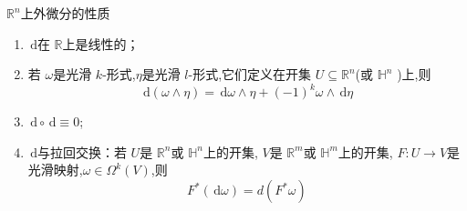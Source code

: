 \documentclass[../../几何与拓扑.tex]{subfiles}
\begin{document}
\begin{proposition}{$ \mathbb{R} ^{n} $上外微分的性质    }\label{Euc-Ext-Diff}  
    \begin{enumerate}
        \item $ \,\mathrm{d}  $在 $ \mathbb{R}  $上是线性的；
        \item 若 $  \omega  $是光滑 $ k $-形式,$ \eta  $是光滑 $ l $-形式,它们定义在开集 $ U\subseteq \mathbb{R} ^{n} $(或 $ \mathbb{H}^{n} $ )上,则 $$
        \,\mathrm{d} \left(  \omega \wedge \eta  \right)=   \,\mathrm{d}  \omega \wedge \eta + \left( -1 \right)^{k} \omega \wedge \,\mathrm{d} \eta       
        $$
        \item $ \,\mathrm{d} \circ\,\mathrm{d} \equiv 0 $;
        \item $ \,\mathrm{d}  $与拉回交换：若 $ U $是 $ \mathbb{R} ^{n} $或 $ \mathbb{H}^{n} $上的开集, $ V $是 $ \mathbb{R} ^{m} $或 $ \mathbb{H}^{m} $上的开集, $ F:U\to V $是光滑映射,$  \omega \in  \Omega ^{k}\left( V \right)  $,则 $$
        F^{*}\left( \,\mathrm{d}  \omega  \right) = d\left( F^{*} \omega  \right) 
        $$                 
    \end{enumerate}
    
\end{proposition}
\end{document}
